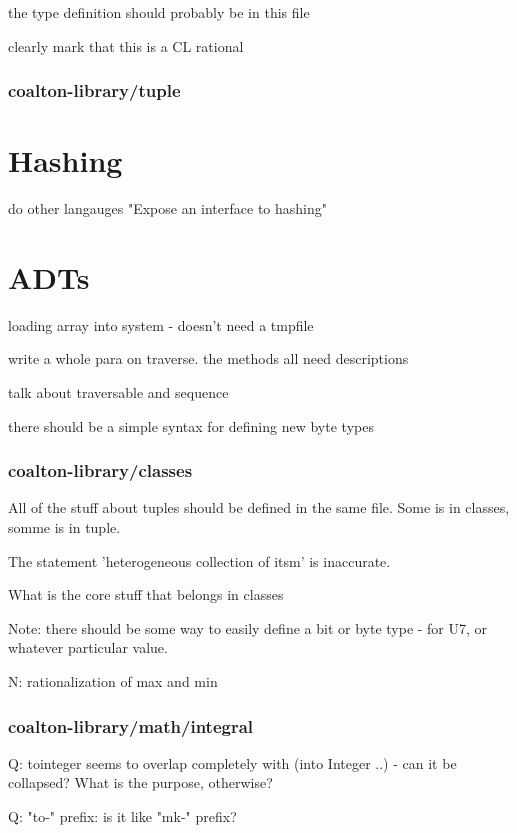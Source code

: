 \documentclass[12pt]{article}
\begin{document}
the type definition should probably be in this file

clearly mark that this is a CL rational

\subsubsection{coalton-library/tuple}

\section{Hashing}

do other langauges "Expose an interface to hashing"

\section{ADTs}

loading array into system - doesn't need a tmpfile

write a whole para on traverse. the methods all need descriptions

talk about traversable and sequence

there should be a simple syntax for defining new byte types

\subsubsection{coalton-library/classes}

All of the stuff about tuples should be defined in the same file. Some
is in classes, somme is in tuple.

The statement 'heterogeneous collection of itsm' is inaccurate.

What is the core stuff that belongs in classes

Note: there should be some way to easily define a bit or byte type - for U7, or whatever particular value.

N: rationalization of max and min

\subsubsection{coalton-library/math/integral}

Q: tointeger seems to overlap completely with (into Integer ..)
- can it be collapsed? What is the purpose, otherwise?

Q: "to-" prefix: is it like "mk-" prefix?
\end{document}
